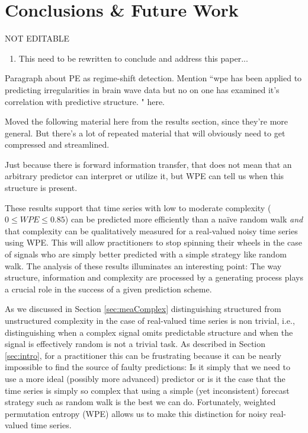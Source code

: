 \section{ Conclusions \& Future Work }\label{sec:conc}
{\color{red} NOT EDITABLE}
\begin{enumerate}
\item  This need to be rewritten to conclude and address this paper...
\end{enumerate}

Paragraph about PE as regime-shift detection.  Mention ``wpe has been
applied to predicting irregularities in brain wave data but no on one
has examined it's correlation with predictive structure. " here.

Moved the following material here from the results section, since
they're more general.  But there's a lot of repeated material that
will obviously need to get compressed and streamlined.

Just because there is forward information transfer, that does not mean
that an arbitrary predictor can interpret or utilize it, but WPE can
tell us when this structure is present.

These results support that time series with low to moderate complexity
($0\le WPE \le 0.85$) can be predicted more efficiently than a na\"ive
random walk \emph{and} that complexity can be qualitatively measured
for a real-valued noisy time series using WPE. This will allow
practitioners to stop spinning their wheels in the case of signals who
are simply better predicted with a simple strategy like random
walk. The analysis of these results illuminates an interesting point:
The way structure, information and complexity are processed by a
generating process plays a crucial role in the success of a given
prediction scheme.

As we discussed in Section \ref{sec:meaComplex} distinguishing
structured from unstructured complexity in the case of real-valued
time series is non trivial, i.e., distinguishing when a complex signal
omits predictable structure and when the signal is effectively random
is not a trivial task. As described in Section \ref{sec:intro}, for a
practitioner this can be frustrating because it can be nearly
impossible to find the source of faulty predictions: Is it simply that
we need to use a more ideal (possibly more advanced) predictor or is
it the case that the time series is simply so complex that using a
simple (yet inconsistent) forecast strategy such as random walk is the
best we can do. Fortunately, weighted permutation entropy (WPE) allows
us to make this distinction for noisy real-valued time series.

